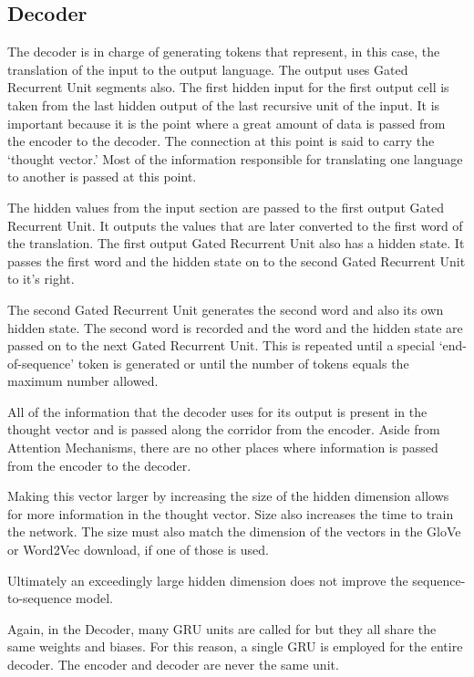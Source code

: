\subsection{Decoder}
The decoder is in charge of generating tokens that represent, in this case, the translation of the input to the output language. The output uses Gated Recurrent Unit segments also. The first hidden input for the first output cell is taken from the last hidden output of the last recursive unit of the input. It is important because it is the point where a great amount of data is passed from the encoder to the decoder. The connection at this point is said to carry the `thought vector.' Most of the information responsible for translating one language to another is passed at this point.

The hidden values from the input section are passed to the first output Gated Recurrent Unit. It outputs the values that are later converted to the first word of the translation. The first output Gated Recurrent Unit also has a hidden state. It passes the first word and the hidden state on to the second Gated Recurrent Unit to it's right.

The second Gated Recurrent Unit generates the second word and also its own hidden state. The second word is recorded and the word and the hidden state are passed on to the next Gated Recurrent Unit. This is repeated until a special `end-of-sequence' token is generated or until the number of tokens equals the maximum number allowed.



All of the information that the decoder uses for its output is present in the thought vector and is passed along the corridor from the encoder. %
Aside from Attention Mechanisms, there are no other places where information is passed from the encoder to the decoder.

Making this vector larger by increasing the size of the hidden dimension allows for more information in the thought vector. Size also increases the time to train the network. The size must also match the dimension of the vectors in the GloVe or Word2Vec download, if one of those is used. 

Ultimately an exceedingly large hidden dimension does not improve the sequence-to-sequence model.

Again, in the Decoder, many GRU units are called for but they all share the same weights and biases. For this reason, a single GRU is employed for the entire decoder. The encoder and decoder are never the same unit.

